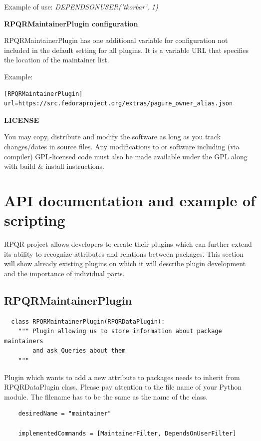 Example of use: \textit{DEPENDSONUSER('tkorbar', 1)}

\textbf{RPQRMaintainerPlugin configuration}

RPQRMaintainerPlugin has one additional variable for configuration not included in the default setting for
all plugins. It is a variable URL that specifies the location of the maintainer list.

Example:
\begin{lstlisting}
[RPQRMaintainerPlugin]
url=https://src.fedoraproject.org/extras/pagure_owner_alias.json
\end{lstlisting}

\textbf{LICENSE}

You may copy, distribute and modify the software as long as you track changes/dates in source files.
Any modifications to or software including (via compiler) GPL-licensed code must also be made available
under the GPL along with build \& install instructions.

\section{API documentation and example of scripting}

RPQR project allows developers to create their plugins which can further extend its ability to
recognize attributes and relations between packages. This section will show already existing plugins
on which it will describe plugin development and the importance of individual parts.

\subsection*{RPQRMaintainerPlugin}

\begin{lstlisting}
  class RPQRMaintainerPlugin(RPQRDataPlugin):
    """ Plugin allowing us to store information about package maintainers
        and ask Queries about them
    """
\end{lstlisting}

Plugin which wants to add a new attribute to packages needs to inherit from RPQRDataPlugin class.
Please pay attention to the file name of your Python module. The filename has to be the same as
the name of the class.

\begin{lstlisting}
    desiredName = "maintainer"

    implementedCommands = [MaintainerFilter, DependsOnUserFilter]
\end{lstlisting}

